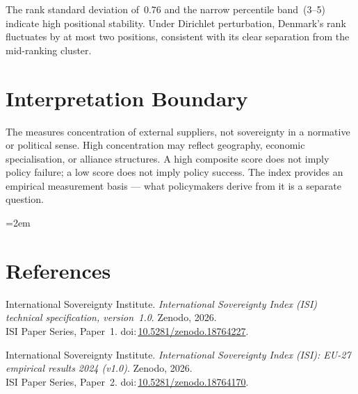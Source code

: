 \documentclass[12pt,a4paper]{article}
\begin{document}
The rank standard deviation of~0.76 and the narrow percentile band~(3--5) indicate high positional stability.  Under Dirichlet perturbation, Denmark's rank fluctuates by at most two positions, consistent with its clear separation from the mid-ranking cluster.


\section{Interpretation Boundary}
\label{sec:interpretation}

The \ISI measures concentration of external suppliers, not sovereignty in a normative or political sense.  High concentration may reflect geography, economic specialisation, or alliance structures.  A high composite score does not imply policy failure; a low score does not imply policy success.  The index provides an empirical measurement basis --- what policymakers derive from it is a separate question.


\clearpage
\vspace*{1.5cm}

\begingroup\emergencystretch=2em
\section*{References}

\begin{enumerate}[label={[\arabic*]},leftmargin=2em,itemsep=6pt]
\item International Sovereignty Institute.
  \textit{International Sovereignty Index (ISI) technical specification, version~1.0}.
  Zenodo, 2026.\\ISI Paper Series, Paper~1.
  doi:\,\href{https://doi.org/10.5281/zenodo.18764227}{10.5281/zenodo.18764227}.

\item International Sovereignty Institute.
  \textit{International Sovereignty Index (ISI): EU-27 empirical results 2024 (v1.0)}.
  Zenodo, 2026.\\ISI Paper Series, Paper~2.
  doi:\,\href{https://doi.org/10.5281/zenodo.18764170}{10.5281/zenodo.18764170}.
\end{enumerate}
\endgroup
\end{document}
